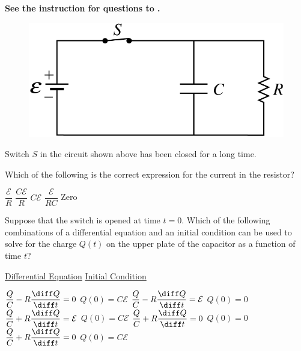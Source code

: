 \textbf{See the instruction for questions  to .}

\begin{figure}[H]
    \centering
    \includegraphics[scale=0.3]{images/img-004-004.png}
\end{figure}

Switch $S$ in the circuit shown above has been closed for a long time.

\begin{questions}\setcounter{question}{6}\question
Which of the following is the correct expression for the current in the resistor?

\begin{oneparchoices}
\choice $\dfrac{\mathcal{E}}{R}$
\choice $\dfrac{C \mathcal{E}}{R}$
\choice $C \mathcal{E}$
\choice $\dfrac{\mathcal{E}}{R C}$
\choice Zero
\end{oneparchoices}\end{questions}

\begin{questions}\setcounter{question}{7}\question
Suppose that the switch is opened at time $t=0$. Which of the following combinations of a differential equation and an initial condition can be used to solve for the charge $Q(t)$ on the upper plate of the capacitor as a function of time $t$?

\tabto{0.75cm} \underline{Differential Equation}
\tabto{6.00cm} \underline{Initial Condition}

\begin{choices}
\choice $\dfrac{Q}{C}-R \dfrac{\diff Q}{\diff t}=0$           \tabto{5.25cm} $Q(0)=C \mathcal{E}$
\choice $\dfrac{Q}{C}-R \dfrac{\diff Q}{\diff t}=\mathcal{E}$ \tabto{5.25cm} $Q(0)=0$
\choice $\dfrac{Q}{C}+R \dfrac{\diff Q}{\diff t}=\mathcal{E}$ \tabto{5.25cm} $Q(0)=C \mathcal{E} $
\choice $\dfrac{Q}{C}+R \dfrac{\diff Q}{\diff t}=0$           \tabto{5.25cm} $Q(0)=0$
\choice $\dfrac{Q}{C}+R \dfrac{\diff Q}{\diff t}=0$           \tabto{5.25cm} $Q(0)=C \mathcal{E}$
\end{choices}\end{questions}
